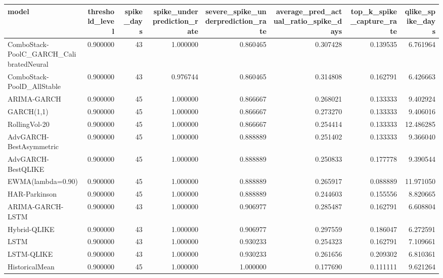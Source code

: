 \begin{tabular}{l r r r r r r r}
\hline
model & threshold\_level & spike\_days & spike\_underprediction\_rate & severe\_spike\_underprediction\_rate & average\_pred\_actual\_ratio\_spike\_days & top\_k\_spike\_capture\_rate & qlike\_spike\_days \\
\hline
ComboStack-PoolC\_GARCH\_CalibratedNeural & 0.900000 & 43 & 1.000000 & 0.860465 & 0.307428 & 0.139535 & 6.761964 \\
ComboStack-PoolD\_AllStable & 0.900000 & 43 & 0.976744 & 0.860465 & 0.314808 & 0.162791 & 6.426663 \\
ARIMA-GARCH & 0.900000 & 45 & 1.000000 & 0.866667 & 0.268021 & 0.133333 & 9.402924 \\
GARCH(1,1) & 0.900000 & 45 & 1.000000 & 0.866667 & 0.273270 & 0.133333 & 9.406016 \\
RollingVol-20 & 0.900000 & 45 & 1.000000 & 0.866667 & 0.254414 & 0.133333 & 12.486285 \\
AdvGARCH-BestAsymmetric & 0.900000 & 45 & 1.000000 & 0.888889 & 0.251402 & 0.133333 & 9.366040 \\
AdvGARCH-BestQLIKE & 0.900000 & 45 & 1.000000 & 0.888889 & 0.250833 & 0.177778 & 9.390544 \\
EWMA(lambda=0.90) & 0.900000 & 45 & 1.000000 & 0.888889 & 0.265917 & 0.088889 & 11.971050 \\
HAR-Parkinson & 0.900000 & 45 & 1.000000 & 0.888889 & 0.244603 & 0.155556 & 8.820665 \\
ARIMA-GARCH-LSTM & 0.900000 & 43 & 1.000000 & 0.906977 & 0.285487 & 0.162791 & 6.608804 \\
Hybrid-QLIKE & 0.900000 & 43 & 1.000000 & 0.906977 & 0.297559 & 0.186047 & 6.272591 \\
LSTM & 0.900000 & 43 & 1.000000 & 0.930233 & 0.254323 & 0.162791 & 7.109661 \\
LSTM-QLIKE & 0.900000 & 43 & 1.000000 & 0.930233 & 0.261656 & 0.209302 & 6.810361 \\
HistoricalMean & 0.900000 & 45 & 1.000000 & 1.000000 & 0.177690 & 0.111111 & 9.621264 \\
\hline
\end{tabular}
